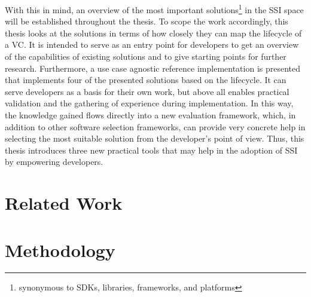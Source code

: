 	With this in mind, an overview of the most important solutions\footnote{synonymous to SDKs, libraries, frameworks, and platforms} in the \ac{SSI} space will be established throughout the thesis. To scope the work accordingly, this thesis looks at the solutions in terms of how closely they can map the lifecycle of a \acf{VC}. It is intended to serve as an entry point for developers to get an overview of the capabilities of existing solutions and to give starting points for further research. 
	Furthermore, a use case agnostic reference implementation is presented that implements four of the presented solutions based on the lifecycle. It can serve developers as a basis for their own work, but above all enables practical validation and the gathering of experience during implementation. In this way, the knowledge gained flows directly into a new evaluation framework, which, in addition to other software selection frameworks, can provide very concrete help in selecting the most suitable solution from the developer's point of view. Thus, this thesis introduces three new practical tools that may help in the adoption of \ac{SSI} by empowering developers.

	\section{Related Work}
	\section{Methodology}

